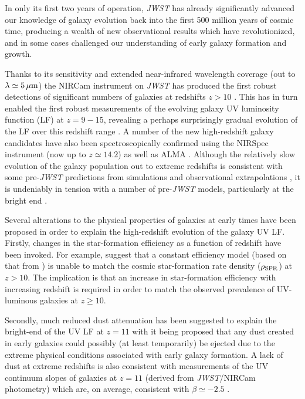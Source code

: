 \documentclass[fleqn,usenatbib]{mnras}
\begin{document}
In only its first two years of operation, {\it JWST} has already significantly advanced our knowledge of galaxy evolution back into the first 500 million years of cosmic time, producing a wealth of new observational results which have revolutionized, and in some cases challenged our understanding of early galaxy formation and growth.

Thanks to its sensitivity and extended near-infrared wavelength coverage (out to $\lambda\simeq5\, \mu \rm m$) the NIRCam instrument on \textit{JWST} has produced the first robust detections of significant numbers of galaxies at redshifts $z>10$ \citep[e.g.][]{castellano2022,naidu2022,donnan2023a, donnan2023b,adams2022, finkelstein2022c,harikane2023a}. This has in turn enabled the first robust measurements of the evolving galaxy UV luminosity function (LF) at $z=9-15$, revealing a perhaps surprisingly gradual evolution of the LF over this redshift range \citep[e.g.][]{finkelstein2023, perezgonzalez2023, mcleod2023, adams2023, donnan2024}. A number of the new high-redshift  galaxy candidates have also been spectroscopically confirmed using the NIRSpec instrument (now up to $z\simeq14.2$) \citep[e.g.][]{curtislake2022, bunker2023, arrabalharo2023, carniani2024} as well as ALMA \citep{schouws2024}. Although the relatively slow evolution of the galaxy population out to extreme redshifts is consistent with some pre-\textit{JWST} predictions from simulations \citep{wilkins2022} and observational extrapolations  \citep{mcleod2016}, it is undeniably in tension with a number of pre-\textit{JWST} models, particularly at the bright end \citep[e.g.][]{mason2015, tacchella2018, yung2019}.

Several alterations to the physical properties of galaxies at early times have been proposed in order to explain the high-redshift evolution of the galaxy UV LF. Firstly, changes in the star-formation efficiency as a function of redshift have been invoked. For example, \citet{harikane2023a} suggest that a constant efficiency model (based on that from \citet{harikane2022}) is unable to match the cosmic star-formation rate density ($\rho_{\rm SFR}$) at $z>10$. The implication is that an increase in star-formation efficiency with increasing redshift is required in order to match the observed prevalence of UV-luminous galaxies at $z\geq10$.

Secondly, much reduced dust attenuation has been suggested to explain the bright-end of the UV LF at $z=11$ \citep[e.g.][]{ferrara2023} with it being proposed that any dust created in early galaxies could possibly (at least temporarily) be ejected due to the extreme physical conditions associated with early galaxy formation. A lack of dust at extreme redshifts is also consistent with measurements of the UV continuum slopes of galaxies at $z=11$ (derived from \textit{JWST}/NIRCam photometry) which are, on average, consistent with $\beta\simeq-2.5$  \citep[e.g.][]{topping2023,morales2023,cullen2023}. 
\end{document}
